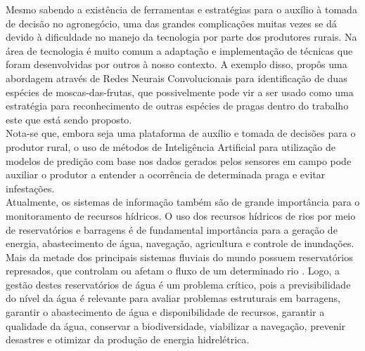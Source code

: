 \documentclass[tcc-proposta]{texufpel}
\begin{document}

Mesmo sabendo a existência de ferramentas e estratégias para o auxílio à tomada de decisão no agronegócio, uma das grandes complicações muitas vezes se dá devido à dificuldade no manejo da tecnologia por parte dos produtores rurais. Na área de tecnologia é muito comum a adaptação e implementação de técnicas que foram desenvolvidas por outros à nosso contexto. A exemplo disso, \citet{Valter:Lucas:2019} propôs uma abordagem através de Redes Neurais Convolucionais para identificação de duas espécies de moscas-das-frutas, que possivelmente pode vir a ser usado como uma estratégia para reconhecimento de outras espécies de pragas dentro do trabalho este que está sendo proposto.
\\

Nota-se que, embora seja uma plataforma de auxílio e tomada de decisões para o produtor rural, o uso de métodos de Inteligência Artificial para utilização de modelos de predição com base nos dados gerados pelos sensores em campo pode auxiliar o produtor a entender a ocorrência de determinada praga e evitar infestações. 
\\

Atualmente, os sistemas de informação também são de grande importância para o monitoramento de recursos hídricos. O uso dos recursos hídricos de rios por meio de reservatórios e barragens é de fundamental importância para a geração de energia, abastecimento de água, navegação, agricultura e controle de inundações. Mais da metade dos principais sistemas fluviais do mundo possuem reservatórios represados, que controlam ou afetam o fluxo de um determinado rio \citet{Joo:2015}. Logo, a gestão destes reservatórios de água é um problema crítico, pois a previsibilidade do nível da água é relevante para avaliar problemas estruturais em barragens, garantir o abastecimento de água e disponibilidade de recursos, garantir a qualidade da água, conservar a biodiversidade, viabilizar a navegação, prevenir desastres e otimizar da produção de energia hidrelétrica.
\\
\end{document}
